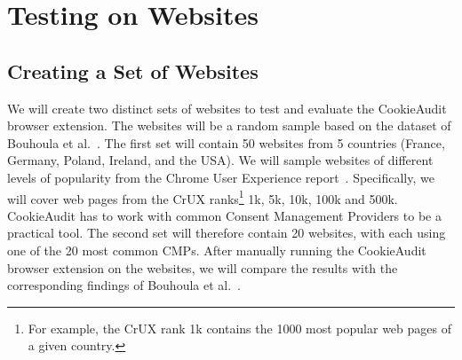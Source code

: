 \chapter{Testing on Websites}

\section{Creating a Set of Websites}

We will create two distinct sets of websites to test and evaluate the CookieAudit browser extension. 
The websites will be a random sample based on the dataset of Bouhoula et al.~\cite{bouhoula2023automated}. 
The first set will contain 50 websites from 5 countries (France, Germany, Poland, Ireland, and the USA).
We will sample websites of different levels of popularity from the Chrome User Experience report~\cite{chrome2024crux}.
Specifically, we will cover web pages from the CrUX ranks\footnote{For example, the CrUX rank 1k contains the 1000 most popular web pages of a given country.} 1k, 5k, 10k, 100k and 500k.
CookieAudit has to work with common Consent Management Providers to be a practical tool.
The second set will therefore contain 20 websites, with each using one of the 20 most common CMPs. 
After manually running the CookieAudit browser extension on the websites, we will compare the results with the corresponding findings of Bouhoula et al.~\cite{bouhoula2023automated}.